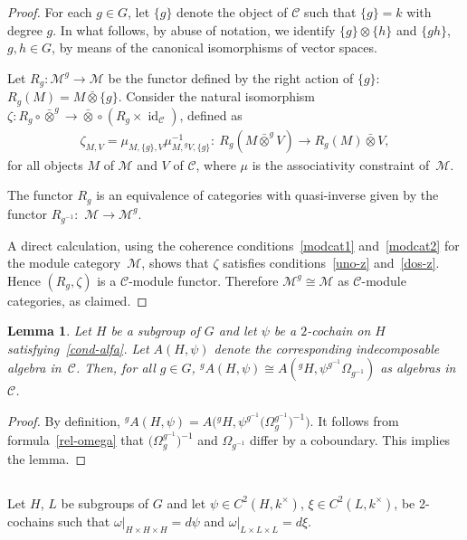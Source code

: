 \documentclass[11pt]{article}
\numberwithin{equation}{section}
\newtheorem{Lemma}[Theorem]{Lemma}
 { \theoremstyle{definition}
\newtheorem{Example}[Theorem]{Example}
\newtheorem{Remark}[Theorem]{Remark} }
\newcommand{\cch}{\Omega}
\newcommand{\oot}{\bar\otimes}
\newcommand{\C}{{\mathcal C}}
\newcommand{\M}{{\mathcal M}}
\newcommand{\1}{\textbf{1}}
\newcommand\id{\operatorname{id}}
\begin{document}
\begin{proof} For each $g \in G$, let $\{g\}$ denote the object of $\C$ such that $\{g\} = k$ with degree $g$. In what follows, by abuse of notation, we identify $\{g\} \otimes \{h\}$ and $\{gh\}$, $g, h \in G$, by means of the canonical isomorphisms of vector spaces.

Let $R_g\colon \M^g \to \M$ be the functor def\/ined by the right action of $\{g\}$: $R_g(M) = M \oot \{g\}$. Consider the natural isomorphism $\zeta\colon R_g \circ \oot^g \to \oot \circ (R_g \times \id_\C)$, def\/ined as
\begin{gather*}\zeta_{M, V} = \mu_{M, \{g\}, V} \mu^{-1}_{M, {}^g V, \{g\}}\colon \ R_g(M\oot^g V) \to R_g(M) \oot V,
\end{gather*} for all objects $M$ of $\M$ and $V$ of $\C$, where $\mu$ is the associativity constraint of~$\M$.

The functor $R_g$ is an equivalence of categories with quasi-inverse given by the functor $R_{g^{-1}}\colon$ $\M \to \M^g$.

A direct calculation, using the coherence conditions~\eqref{modcat1} and~\eqref{modcat2} for the module category~$\M$, shows that $\zeta$ satisf\/ies conditions~\eqref{uno-z} and~\eqref{dos-z}. Hence $(R_g, \zeta)$ is a $\C$-module functor. Therefore $\M^g \cong \M$ as $\C$-module categories, as claimed. \end{proof}

\begin{Lemma}\label{gdea} Let $H$ be a subgroup of $G$ and let $\psi$ be a $2$-cochain on $H$ satisfying~\eqref{cond-alfa}. Let $A(H, \psi)$ denote the corresponding indecomposable algebra in~$\C$. Then, for all $g \in G$, ${}^gA(H, \psi) \cong A({}^gH, \psi^{g^{-1}} \cch_{g^{-1}})$ as algebras in~$\C$.
\end{Lemma}

\begin{proof} By def\/inition, ${}^gA(H, \psi) = A\big({}^gH, \psi^{g^{-1}} \big(\cch_{g}^{g^{-1}}\big)^{-1}\big)$. It follows from formula~\eqref{rel-omega} that $\big(\cch_{g}^{g^{-1}}\big)^{-1}$ and $\cch_{g^{-1}}$ dif\/fer by a coboundary. This implies the lemma. \end{proof}

\subsection{} Let $H$, $L$ be subgroups of $G$ and let $\psi \in C^2(H, k^\times)$, $\xi \in C^2(L, k^\times)$, be 2-cochains such that $\omega\vert_{H \times H \times H} = d\psi$ and $\omega\vert_{L \times L \times L} = d\xi$.
\end{document}
